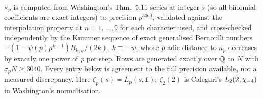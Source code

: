 \begin{verification}\label{ver:eulercensus}
$\kappa_p$ is computed from Washington's Thm.~5.11 series at integer $s$
\textup{(}so all binomial coefficients are exact integers\textup{)} to
precision $p^{3060}$, validated against the interpolation property at
$n=1,\dots,9$ for each character used, and cross-checked independently by the
Kummer sequence of exact generalised Bernoulli numbers
$-(1-\psi(p)p^{k-1})B_{k,\psi}/(2k)$, $k\equiv-w$, whose $p$-adic distance to
$\kappa_p$ decreases by exactly one power of $p$ per step.  Rows are generated
exactly over $\mathbb{Q}$ to $N$ with $\sigma_pN\ge3040$.  Every entry below is
agreement to the full precision available, not a measured discrepancy.
Here $\zeta_p(s)=L_p(s,\mathbf 1)$; $\zeta_2(2)$ is Calegari's
$L_2(2,\chi_{-4})$ in Washington's normalisation.


\end{verification}
